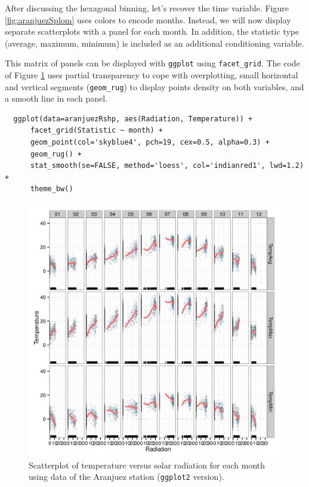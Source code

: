 \documentclass[smallroyalvopaper]{memoir}
\begin{document}
After discussing the hexagonal binning, let's recover the time
variable. Figure \ref{fig:aranjuezSplom} uses colors to encode
months. Instead, we will now display separate scatterplots with a
panel for each month. In addition, the statistic type (average,
maximum, minimum) is included as an additional conditioning variable.

This matrix of panels can be displayed with \texttt{ggplot} using
\texttt{facet\_grid}. The code of Figure \ref{fig:aranjuezFacetGrid} uses partial
transparency to cope with overplotting, small horizontal and vertical
segments (\texttt{geom\_rug}) to display points density on both variables, and
a smooth line in each panel.
\lstset{language=r,label= ,caption= ,captionpos=b,numbers=none}
\begin{lstlisting}
  ggplot(data=aranjuezRshp, aes(Radiation, Temperature)) +
      facet_grid(Statistic ~ month) +
      geom_point(col='skyblue4', pch=19, cex=0.5, alpha=0.3) +
      geom_rug() +
      stat_smooth(se=FALSE, method='loess', col='indianred1', lwd=1.2) +
      theme_bw()
\end{lstlisting}

\begin{figure}[htbp]
\centering
\includegraphics[width=.9\linewidth]{figs/aranjuezFacetGrid.png}
\caption{Scatterplot of temperature versus solar radiation for each month using data of the Aranjuez station (\texttt{ggplot2} version). \label{fig:aranjuezFacetGrid}}
\end{figure}
\end{document}
